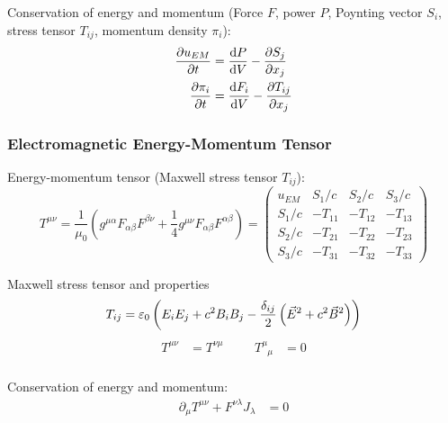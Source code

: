 			\noindent
			Conservation of energy and momentum (Force $F$, power $P$, Poynting vector $S_i$, stress tensor $T_{ij}$, momentum density $\pi_i$):
			\begin{equation}
				\begin{aligned}
					\frac{\partial u_{EM}}{\partial t} &= \frac{\mathrm{d} P}{\mathrm{d} V} - \frac{\partial S_j}{\partial x_j} \\
					\frac{\partial \pi_i}{\partial t} &=	\frac{\mathrm{d} F_i}{\mathrm{d} V} - \frac{\partial T_{ij}}{\partial x_j}
				\end{aligned}
			\end{equation}

		\subsubsection{Electromagnetic Energy-Momentum Tensor}
			\noindent
			Energy-momentum tensor (Maxwell stress tensor $T_{ij}$):
			\begin{equation}
				T^{\mu\nu} = \frac{1}{\mu_0}\left(g^{\mu\alpha} F_{\alpha\beta} F^{\beta\nu} +\frac{1}{4}g^{\mu\nu} F_{\alpha\beta} F^{\alpha\beta} \right)
				= \left( \begin{matrix}
					u_{EM} & S_1/c & S_2/c & S_3/c \\
					S_1/c & -T_{11} & -T_{12} & -T_{13} \\
					S_2/c	& -T_{21} & -T_{22} & -T_{23} \\
					S_3/c & -T_{31} & -T_{32} & -T_{33}
				\end{matrix} \right)
			\end{equation}

			\noindent
			Maxwell stress tensor and properties
			\begin{equation}
				T_{ij} = \varepsilon_0 \left(  E_i E_j + c^2 B_i B_j - \frac{\delta_{ij}}{2}\left(  \vec{E}^2 + c^2 \vec{B}^2  \right)  \right)
			\end{equation}
			\begin{equation}
				\begin{aligned}
					T^{\mu\nu} &= T^{\nu\mu} &\hspace{20pt}
					T^\mu_{\phantom{\mu}\mu} &= 0 \\
				\end{aligned}
			\end{equation}

			\noindent
			Conservation of energy and momentum:
			\begin{equation}
				\begin{aligned}
					\partial_\mu T^{\mu\nu} + F^{\nu\lambda} J_\lambda &= 0
				\end{aligned}
			\end{equation}


